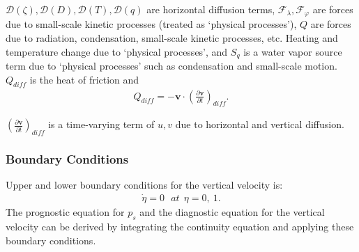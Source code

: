 \({\mathcal D}(\zeta), {\mathcal D}(D), {\mathcal D}(T), {\mathcal D}(q)\)
are horizontal diffusion terms,
\({\mathcal F}_\lambda, {\mathcal F}_\varphi\) are forces due to
small-scale kinetic processes (treated as `physical processes'), \(Q\)
are forces due to radiation, condensation, small-scale kinetic
processes, etc. Heating and temperature change due to `physical
processes', and \(S_q\) is a water vapor source term due to `physical
processes' such as condensation and small-scale motion. \(Q_{diff}\) is
the heat of friction and
\begin{eqnarray}
  Q_{diff}
 = - {\mathbf{v}} \cdot  ( \frac{\partial {\mathbf{v}}}{\partial t} )_{diff} .
\end{eqnarray}

\(( \frac{\partial {\mathbf{v}}}{\partial t} )_{diff}\) is a
time-varying term of \(u,v\) due to horizontal and vertical diffusion.

\hypertarget{boundary-conditions}{%
\subsubsection{Boundary Conditions}\label{boundary-conditions}}

Upper and lower boundary conditions for the vertical velocity is:
\begin{eqnarray}
  \dot{\eta} = 0  \ \ \ at \ \ \eta = 0 , \ 1 .
\end{eqnarray}
The prognostic equation for \(p_s\) and the diagnostic equation for the
vertical velocity can be derived by integrating the continuity equation
and applying these boundary conditions.
